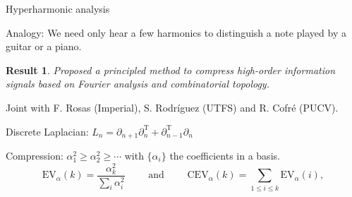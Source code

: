 \documentclass[10pt,t, handout]{beamer} %
\newtheorem{result}{Result}
\begin{document}
\begin{frame}{Hyperharmonic analysis}
	\pause
	
	\vskip -5pt
	
	\textcolor{pblue}{Analogy:} We need only hear a few harmonics to distinguish a note played by a guitar or a piano.
	
	\vskip 5pt
	\pause
	
	\begin{result}
		Proposed a principled method to compress high-order information signals based on Fourier analysis and combinatorial topology.
	\end{result}

	Joint with F. Rosas (Imperial), S. Rodr\'iguez (UTFS) and R. Cofr\'e (PUCV). 
	
	\vskip 15pt
	\pause
	
	\textcolor{pblue}{Discrete Laplacian:} $\displaystyle{L_n = \partial_{n+1} \partial_{n}^{\mathrm T} + \partial_{n-1}^{\mathrm T} \partial_{n}}$
	
	\vskip 15pt
	\pause
	
	\textcolor{pblue}{Compression:} $\alpha_1^2 \geq \alpha_2^2 \geq \cdots$ with $\{\alpha_i\}$ the coefficients in a basis.
	\begin{equation*}
	\text{EV}_{\alpha}(k) = \frac{ \alpha_k^2}{{\displaystyle \sum_{i} \alpha_i^2}}
	\qquad \text{ and } \qquad
	\text{CEV}_{\alpha}(k) = \sum_{1\leq i \leq k} \text{EV}_{\alpha}(i),
	\end{equation*}
\end{frame}
\end{document}

